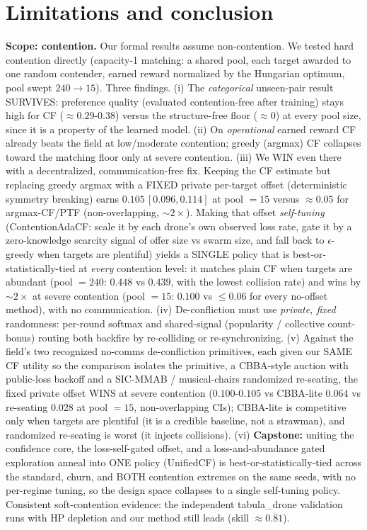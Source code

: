 \documentclass[11pt]{article}
\theoremstyle{plain}
\begin{document}
\section{Limitations and conclusion}
\textbf{Scope: contention.} Our formal results assume non-contention. We tested hard
contention directly (capacity-1 matching: a shared pool, each target awarded to one
random contender, earned reward normalized by the Hungarian optimum, pool swept
$240\to15$). Three findings. (i) The \emph{categorical} unseen-pair result SURVIVES:
preference quality (evaluated contention-free after training) stays high for CF
($\approx0.29$-$0.38$) versus the structure-free floor ($\approx0$) at every pool size,
since it is a property of the learned model. (ii) On \emph{operational} earned reward CF
already beats the field at low/moderate contention; greedy (argmax) CF collapses toward
the matching floor only at severe contention. (iii) We WIN even there with a decentralized,
communication-free fix. Keeping the CF estimate but replacing greedy argmax with a FIXED
private per-target offset (deterministic symmetry breaking) earns $0.105\,[0.096,0.114]$ at
pool $=15$ versus $\approx0.05$ for argmax-CF/PTF (non-overlapping, $\sim2\times$). Making
that offset \emph{self-tuning} (ContentionAdaCF: scale it by each drone's own observed loss
rate, gate it by a zero-knowledge scarcity signal of offer size vs swarm size, and fall back
to $\epsilon$-greedy when targets are plentiful) yields a SINGLE policy that is
best-or-statistically-tied at \emph{every} contention level: it matches plain CF when targets
are abundant (pool $=240$: $0.448$ vs $0.439$, with the lowest collision rate) and wins by
$\sim2\times$ at severe contention (pool $=15$: $0.100$ vs $\le0.06$ for every no-offset
method), with no communication. (iv) De-confliction must use \emph{private, fixed} randomness: per-round
softmax and shared-signal (popularity / collective count-bonus) routing both backfire by
re-colliding or re-synchronizing.
(v) Against the field's two recognized no-comms de-confliction primitives, each given our SAME CF
utility so the comparison isolates the primitive, a CBBA-style auction with public-loss backoff and a
SIC-MMAB / musical-chairs randomized re-seating, the fixed private offset WINS at severe contention
($0.100$-$0.105$ vs CBBA-lite $0.064$ vs re-seating $0.028$ at pool $=15$, non-overlapping CIs);
CBBA-lite is competitive only when targets are plentiful (it is a credible baseline, not a strawman),
and randomized re-seating is worst (it injects collisions).
(vi) \textbf{Capstone:} uniting the confidence core, the loss-self-gated offset, and a loss-and-abundance
gated exploration anneal into ONE policy (UnifiedCF) is best-or-statistically-tied across the standard,
churn, and BOTH contention extremes on the same seeds, with no per-regime tuning, so the design space
collapses to a single self-tuning policy.
Consistent soft-contention evidence: the independent tabula\_drone validation runs with
HP depletion and our method still leads (skill $\approx 0.81$).
\end{document}
